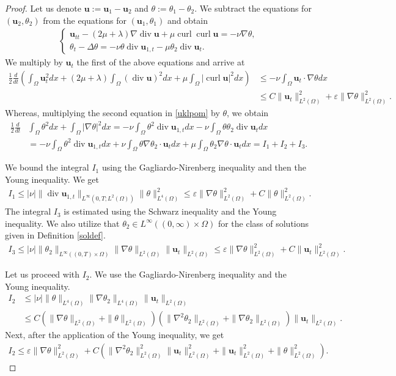 \documentclass[11pt]{article}
\numberwithin{equation}{section}
\theoremstyle{plain}
\newcommand\bb[1]{\mathbf{#1}}
\newcommand{\tn}{\Omega}
\newcommand{\io}{\int_{\Omega}}
\newcommand{\ld}{L^2(\Omega)}
\newcommand{\ul}{\frac{1}{2}}
\newcommand{\ddt}{\frac{d}{dt}}
\renewcommand{\div}{\operatorname{div}}
\DeclareMathOperator{\curl}{curl}
\let \epsilon\varepsilon
\newcommand{\ot}{(0,\infty)\times\Omega}
\newcommand{\wspnd}{2\mu+\lambda}
\newcommand{\bu}{\bb{u}}
\begin{document}
\begin{proof}
Let us denote $\bu:=\bu_1-\bu_2$ and $\theta:=\theta_1-\theta_2$. We subtract the equations for $(\bu_2,\theta_2)$ from the equations for $(\bu_1,\theta_1)$ and
obtain
\begin{align}\label{uklpom}
\begin{cases}
\bu_{tt}-(\wspnd)\nabla\div\bu+\mu\curl\curl\bu=-\nu\nabla\theta,\\
\theta_t-\Delta\theta=-\nu\theta \div \bu_{1,t}-\mu \theta_2\div \bu_{t}.
\end{cases}
\end{align}
We multiply by $\bu_t$ the first of the above equations and arrive at
\begin{align}\label{glrow1}
\ul\ddt\left(\io \bu_t^2dx+(\wspnd)\io (\div \bu)^2dx+\mu\io |\curl \bu|^2dx \right)&\leq-\nu\io \bu_t\cdot\nabla\theta dx\nonumber\\
&\leq C\|\bu_t\|_{\ld}^2+\epsilon\|\nabla \theta\|^2_{\ld}.
\end{align}
Whereas, multiplying the second equation in \eqref{uklpom} by $\theta$, we obtain
\begin{align}\label{glrow2}
\nonumber\ul\ddt&\io\theta^2 dx+\io|\nabla\theta|^2 dx=-\nu\io\theta^2\div \bu_{1,t}dx-\nu\io\theta\theta_2\div \bu_{t}dx\\
&=-\nu\io\theta^2\div \bu_{1,t}dx+\nu\io\theta\nabla\theta_2\cdot \bu_{t}dx+\mu\io\theta_2\nabla\theta\cdot \bu_{t}dx=I_1+I_2+I_3.
\end{align}

We bound the integral $I_1$ using the Gagliardo-Nirenberg inequality and then the Young inequality. We get
\begin{align}\label{inconde1}
I_1\leq |\nu|\|\div \bu_{1,t}\|_{L^{\infty}(0,T;\ld)}\|\theta\|_{L^4(\tn)}^2\leq \epsilon\|\nabla\theta\|^2_{\ld}+C\|\theta\|_{\ld}^2.
\end{align}
The integral $I_{3}$ is estimated using the Schwarz inequality and the Young inequality. We also utilize that $\theta_2\in L^{\infty}(\ot)$ for the class of solutions given in Definition \ref{soldef}.
\begin{align}\label{inconde2}
I_{3}\leq |\nu|\|\theta_2\|_{L^{\infty}((0,T)\times\tn)}\|\nabla\theta\|_{\ld}\|\bu_t\|_{\ld}\leq \epsilon\|\nabla\theta\|_{\ld}^2+C\|\bu_t\|_{\ld}^2.
\end{align}

Let us proceed with $I_{2}$. We use the Gagliardo-Nirenberg inequality and the Young inequality.
\begin{align*}
I_{2}&\leq |\nu| \|\theta\|_{L^4(\tn)}\|\nabla\theta_2\|_{L^4(\tn)}\|\bu_t\|_{\ld}\\
&\leq C(\|\nabla\theta\|_{\ld}+\|\theta\|_{\ld})(\|\nabla^2\theta_2\|_{\ld}+\|\nabla\theta_2\|_{\ld})\|\bu_t\|_{\ld}.
\end{align*}
Next, after the application of the Young inequality, we get
\begin{align}\label{inconde3}
I_{2}\leq \epsilon\|\nabla\theta\|_{\ld}^2+ C(\|\nabla^2\theta_2\|_{\ld}^2\|\bu_t\|_{\ld}^2+\|\bu_t\|_{\ld}^2+\|\theta\|_{\ld}^2).
\end{align}


\end{proof}
\end{document}
